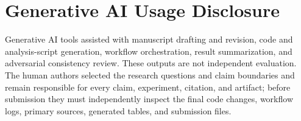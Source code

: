 \documentclass[sigplan,screen,review,anonymous]{acmart}
\begin{document}










\section*{Generative AI Usage Disclosure}
Generative AI tools assisted with manuscript drafting and revision, code and analysis-script generation, workflow orchestration, result summarization, and adversarial consistency review. These outputs are not independent evaluation. The human authors selected the research questions and claim boundaries and remain responsible for every claim, experiment, citation, and artifact; before submission they must independently inspect the final code changes, workflow logs, primary sources, generated tables, and submission files.

\end{document}
